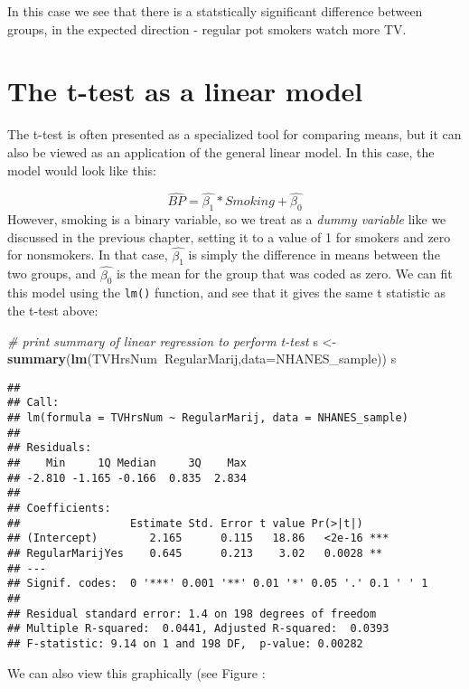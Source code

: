 \documentclass[]{book}
\newenvironment{Shaded}{\begin{snugshade}}{\end{snugshade}}
\newcommand{\KeywordTok}[1]{\textcolor[rgb]{0.13,0.29,0.53}{\textbf{#1}}}
\newcommand{\DataTypeTok}[1]{\textcolor[rgb]{0.13,0.29,0.53}{#1}}
\newcommand{\StringTok}[1]{\textcolor[rgb]{0.31,0.60,0.02}{#1}}
\newcommand{\CommentTok}[1]{\textcolor[rgb]{0.56,0.35,0.01}{\textit{#1}}}
\newcommand{\OperatorTok}[1]{\textcolor[rgb]{0.81,0.36,0.00}{\textbf{#1}}}
\newcommand{\NormalTok}[1]{#1}
\theoremstyle{definition}
\theoremstyle{definition}
\theoremstyle{definition}
\theoremstyle{remark}
\begin{document}
In this case we see that there is a statstically significant difference
between groups, in the expected direction - regular pot smokers watch
more TV.

\section{The t-test as a linear
model}\label{the-t-test-as-a-linear-model}

The t-test is often presented as a specialized tool for comparing means,
but it can also be viewed as an application of the general linear model.
In this case, the model would look like this:

\[
\hat{BP} = \hat{\beta_1}*Smoking + \hat{\beta_0}
\] However, smoking is a binary variable, so we treat as a \emph{dummy
variable} like we discussed in the previous chapter, setting it to a
value of 1 for smokers and zero for nonsmokers. In that case,
\(\hat{\beta_1}\) is simply the difference in means between the two
groups, and \(\hat{\beta_0}\) is the mean for the group that was coded
as zero. We can fit this model using the \texttt{lm()} function, and see
that it gives the same t statistic as the t-test above:

\begin{Shaded}
\begin{Highlighting}[]
\CommentTok{# print summary of linear regression to perform t-test}
\NormalTok{s <-}\StringTok{ }\KeywordTok{summary}\NormalTok{(}\KeywordTok{lm}\NormalTok{(TVHrsNum}\OperatorTok{~}\NormalTok{RegularMarij,}\DataTypeTok{data=}\NormalTok{NHANES_sample))}
\NormalTok{s}
\end{Highlighting}
\end{Shaded}

\begin{verbatim}
## 
## Call:
## lm(formula = TVHrsNum ~ RegularMarij, data = NHANES_sample)
## 
## Residuals:
##    Min     1Q Median     3Q    Max 
## -2.810 -1.165 -0.166  0.835  2.834 
## 
## Coefficients:
##                 Estimate Std. Error t value Pr(>|t|)    
## (Intercept)        2.165      0.115   18.86   <2e-16 ***
## RegularMarijYes    0.645      0.213    3.02   0.0028 ** 
## ---
## Signif. codes:  0 '***' 0.001 '**' 0.01 '*' 0.05 '.' 0.1 ' ' 1
## 
## Residual standard error: 1.4 on 198 degrees of freedom
## Multiple R-squared:  0.0441, Adjusted R-squared:  0.0393 
## F-statistic: 9.14 on 1 and 198 DF,  p-value: 0.00282
\end{verbatim}

We can also view this graphically (see Figure :
\end{document}
